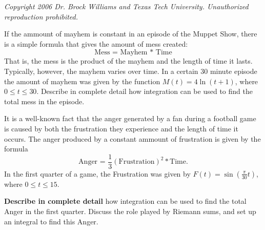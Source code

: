 \documentclass{exam}[12pt]
\begin{document}
\pagestyle{head}

\small{\textit{
Copyright 2006 Dr. Brock Williams and
Texas Tech University.  Unauthorized reproduction prohibited.
}}

\begin{questions}
\large{


\question If the ammount of mayhem is constant in an episode of the
Muppet Show, there is a simple formula that gives the amount of mess created:
\[
\text{Mess = Mayhem * Time}
\]
That is, the mess is the product of the mayhem and the length of time it lasts.
Typically, however, the mayhem varies over time.  
In a certain 30 minute episode the amount of mayhem was given by the function 
$M(t) = 4 \ln(t+1)$, where $0\leq t\leq 30$.
Describe in complete detail how integration can be used to 
find the total mess in the episode.
\vspace{.4in}


\question  It is a well-known fact that the anger generated by a fan
during a football game is caused by both the frustration they experience
and the length of time it occurs.  The anger produced by a 
 constant ammount of frustration is given by the formula
\[
\text{Anger = }\frac{1}{3} \left(\text {Frustration}\right)^2 * \text{Time}.
\]
In the first quarter of a game, the Frustration was given by
$\displaystyle F(t)= \sin\left(\frac{\pi}{30} t\right)  $, where $0\leq t\leq 15$.
\vspace{.1in}

\textbf{Describe in complete detail} how integration can be used to find
the total Anger in the first quarter.  Discuss the role played by Riemann 
sums, and set up an integral to find this Anger.

\vspace{.4in}
\question %



}
\end{questions}
\end{document}
